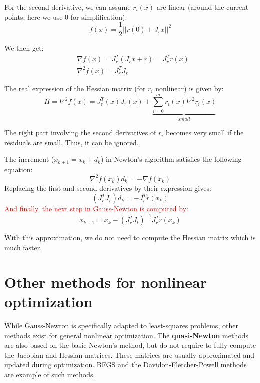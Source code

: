 For the second derivative, we can assume $r_i(x)$ are linear (around the current points, here we use 0 for simplification).
\begin{equation}
    f(x) = \frac{1}{2} ||r(0) + J_rx||^2
\end{equation}

We then get:
\begin{equation}
\begin{split}
    &\nabla f(x) = J_r^T(J_rx+r) = J_r^T r(x) \\
    &\nabla^2 f(x) = J_r^TJ_r
\end{split}
\end{equation}

The real expression of the Hessian matrix (for $r_i$ nonlinear) is given by:
\begin{equation}
    H = \nabla^2 f(x) = J_r^T(x)J_r(x) + \underbrace{\sum_{i=0}^m r_i(x)\nabla^2 r_i(x)}_{small}
\end{equation}

The right part involving the second derivatives of $r_i$ becomes very small if the residuals are small. Thus, it can be ignored.

The increment ($x_{k+1}=x_k+d_k$) in Newton's algorithm satisfies the following equation:
\begin{equation}
    \nabla^2 f(x_k) d_k = -\nabla f(x_k)
\end{equation}
Replacing the first and second derivatives by their expression gives:
\begin{equation}
    (J_r^TJ_r)d_k = -J_r^Tr(x_k)
\end{equation}
\textcolor{red}{And finally, the next step in Gauss-Newton is computed by:}
\begin{equation}
    x_{k+1} = x_k - (J_r^TJ_t)^{-1} J_r^Tr(x_k)
\end{equation}

With this approximation, we do not need to compute the Hessian matrix which is much faster.

\section{Other methods for nonlinear optimization}
While Gauss-Newton is specifically adapted to least-squares problems, other methods exist for general nonlinear optimization.
The \textbf{quasi-Newton} methods are also based on the basic Newton's method, but do not  require to fully compute the Jacobian and Hessian matrices. These matrices are usually approximated and updated during optimization.
BFGS and the Davidon-Fletcher-Powell methods are example of such methods.


